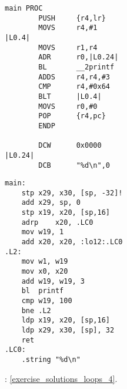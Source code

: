 \begin{lstlisting}[caption=\NonOptimizingKeilVI (\ThumbMode)]
main PROC
        PUSH     {r4,lr}
        MOVS     r4,#1
|L0.4|
        MOVS     r1,r4
        ADR      r0,|L0.24|
        BL       __2printf
        ADDS     r4,r4,#3
        CMP      r4,#0x64
        BLT      |L0.4|
        MOVS     r0,#0
        POP      {r4,pc}
        ENDP

        DCW      0x0000
|L0.24|
        DCB      "%d\n",0
\end{lstlisting}

\begin{lstlisting}[caption=\Optimizing GCC 4.9 (ARM64)]
main:
	stp	x29, x30, [sp, -32]!
	add	x29, sp, 0
	stp	x19, x20, [sp,16]
	adrp	x20, .LC0
	mov	w19, 1
	add	x20, x20, :lo12:.LC0
.L2:
	mov	w1, w19
	mov	x0, x20
	add	w19, w19, 3
	bl	printf
	cmp	w19, 100
	bne	.L2
	ldp	x19, x20, [sp,16]
	ldp	x29, x30, [sp], 32
	ret
.LC0:
	.string	"%d\n"
\end{lstlisting}



: \ref{exercise_solutions_loops_4}.
